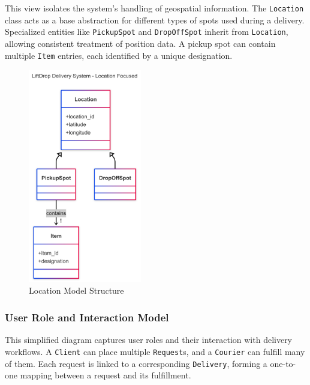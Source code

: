This view isolates the system's handling of geospatial information. The \texttt{Location} class acts as a base abstraction for different types of spots used during a delivery. Specialized entities like \texttt{PickupSpot} and \texttt{DropOffSpot} inherit from \texttt{Location}, allowing consistent treatment of position data. A pickup spot can contain multiple \texttt{Item} entries, each identified by a unique designation.

\begin{figure}[H]
    \centering
    \includegraphics[width=0.44\textwidth]{images/LocationDiagram.png}
    \caption{Location Model Structure}
\end{figure}

\newpage

\subsubsection{User Role and Interaction Model}

This simplified diagram captures user roles and their interaction with delivery workflows. A \texttt{Client} can place multiple \texttt{Request}s, and a \texttt{Courier} can fulfill many of them. Each request is linked to a corresponding \texttt{Delivery}, forming a one-to-one mapping between a request and its fulfillment.
  
